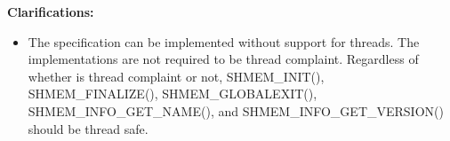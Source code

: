 {\bf Clarifications:}
 
\begin{itemize}
\item[]
The \openshmem{} specification can be implemented without support for threads.
The \openshmem{} implementations are not required to be thread complaint.
Regardless of whether \openshmem{} is thread complaint or not, SHMEM\_INIT(),
SHMEM\_FINALIZE(), SHMEM\_GLOBALEXIT(), SHMEM\_INFO\_GET\_NAME(), and
SHMEM\_INFO\_GET\_VERSION() should be thread safe.
 

\end{itemize}
